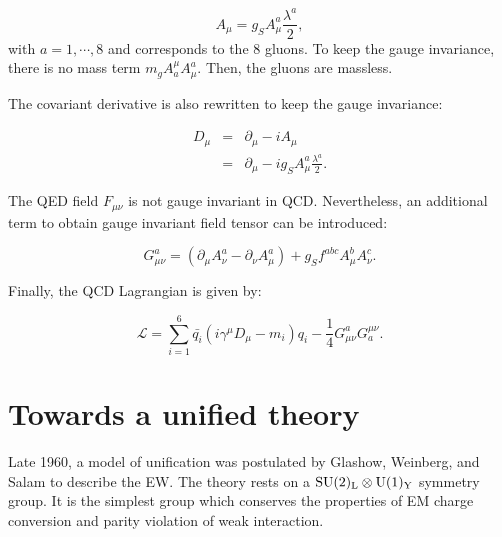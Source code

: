    \begin{equation}
      A_{\mu} = g_S A^a_{\mu}\frac{\lambda^a}{2},
    \end{equation}
    with $a = 1,\cdots,8$ and corresponds to the 8 gluons.
    To keep the gauge invariance, there is no mass term $m_g A^{\mu}_a A^a_{\mu}$.
    Then, the gluons are massless. 

    The covariant derivative is also rewritten to keep the gauge invariance:

    \begin{equation}
      \begin{array}{rcl}
        D_{\mu} & = & \partial_{\mu} - i A_{\mu} \\
                & = & \partial_{\mu} - i g_S A^a_{\mu} \frac{\lambda^a}{2}.
      \end{array}
    \end{equation}

    The \gls{QED} field $F_{\mu \nu}$ is not gauge invariant in \gls{QCD}.
    Nevertheless, an additional term to obtain gauge invariant field tensor can be introduced:
    
    \begin{equation}
      G^a_{\mu \nu} = \left( \partial_{\mu} A^a_{\nu} - \partial_{\nu} A^a_{\mu} \right) + g_S f^{abc} A^b_{\mu} A^c_{\nu}.
    \end{equation} 

    Finally, the \gls{QCD} Lagrangian is given by:

    \begin{equation}
      \mathcal{L} = \sum_{i=1}^6  \bar{q_i} \left(i \gamma^{\mu}D_{\mu} -m_i \right)q_i - \frac{1}{4} G_{\mu \nu}^{a} G_{a}^{\mu \nu}.
    \end{equation}
    
    \section{Towards a unified theory}

    Late 1960, a model of unification was postulated by Glashow, Weinberg, and Salam to describe the \acrfull{EW}.
    The theory rests on a  $\rm{SU}(2)_{\rm{L}} \otimes \rm{U}(1)_{\rm{Y}}$ symmetry group.
    It is the simplest group which conserves the properties of EM charge conversion and parity violation of weak interaction.

